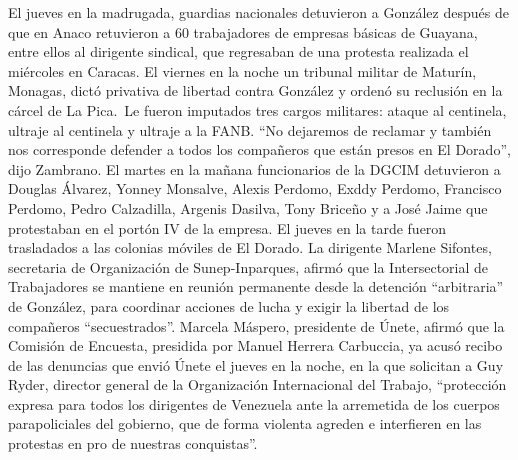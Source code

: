 \documentclass{article}%
\begin{document}
\newline%
%
El jueves en la madrugada, guardias nacionales detuvieron a González después de que en Anaco retuvieron a 60 trabajadores de empresas básicas de Guayana, entre ellos al dirigente sindical, que regresaban de una protesta realizada el miércoles en Caracas. El viernes en la noche un tribunal militar de Maturín, Monagas, dictó privativa de libertad contra González y ordenó su reclusión en la cárcel de La Pica.~Le fueron imputados tres cargos militares: ataque al centinela, ultraje al centinela y ultraje a la FANB.%
\newline%
%
“No dejaremos de reclamar y también nos corresponde defender a todos los compañeros que están presos en El Dorado”, dijo Zambrano. El martes en la mañana funcionarios de la DGCIM detuvieron a Douglas Álvarez, Yonney Monsalve, Alexis Perdomo, Exddy Perdomo, Francisco Perdomo, Pedro Calzadilla, Argenis Dasilva, Tony Briceño y a José Jaime que protestaban en el portón IV de la empresa. El jueves en la tarde fueron trasladados a las colonias móviles de El Dorado.%
\newline%
%
La dirigente Marlene Sifontes, secretaria de Organización de Sunep{-}Inparques, afirmó que la Intersectorial de Trabajadores se mantiene en reunión permanente desde la detención “arbitraria” de González, para coordinar acciones de lucha y exigir la libertad de los compañeros “secuestrados”.%
\newline%
%
Marcela Máspero, presidente de Únete, afirmó que la Comisión de Encuesta, presidida por Manuel Herrera Carbuccia, ya acusó recibo de las denuncias que envió Únete el jueves en la noche, en la que solicitan a Guy Ryder, director general de la Organización Internacional del Trabajo, “protección expresa para todos los dirigentes de Venezuela ante la arremetida de los cuerpos parapoliciales del gobierno, que de forma violenta agreden e interfieren en las protestas en pro de nuestras conquistas”.%
\newline%
%
\end{document}
